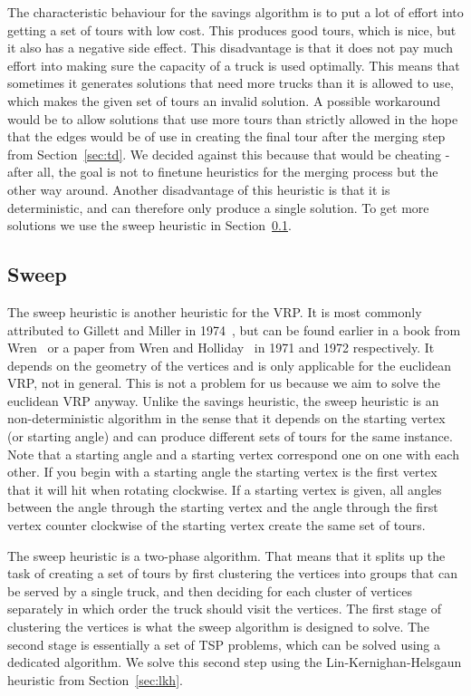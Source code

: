 \documentclass[12pt]{article}
\begin{document}
    The characteristic behaviour for the savings algorithm is to put a lot of effort into getting a
    set of tours with low cost. This produces good tours, which is nice, but it also has a negative
    side effect. This disadvantage is that it does not pay much effort into making sure the capacity
    of a truck is used optimally. This means that sometimes it generates solutions that need more
    trucks than it is allowed to use, which makes the given set of tours an invalid solution. A
    possible workaround would be to allow solutions that use more tours than strictly allowed in the
    hope that the edges would be of use in creating the final tour after the merging step from
    Section~\ref{sec:td}. We decided against this because that would be cheating - after all, the
    goal is not to finetune heuristics for the merging process but the other way around.
    Another disadvantage of this heuristic is that it is deterministic, and can therefore
    only produce a single solution. To get more solutions we use the sweep heuristic in
    Section~\ref{sec:sweep}.


    \subsection{Sweep}
    \label{sec:sweep}
    The sweep heuristic is another heuristic for the VRP\@.  It is most commonly attributed to
    Gillett and Miller in 1974~\cite{sweep}, but can be found earlier in a book from
    Wren~\cite{sweep-orig-1} or a paper from Wren and Holliday~\cite{sweep-orig-2} in 1971 and 1972
    respectively.
    It depends on the geometry of the vertices and is only applicable for the euclidean VRP, not in
    general. This is not a problem for us because we aim to solve the euclidean VRP anyway. Unlike
    the savings heuristic, the sweep heuristic is an non-deterministic algorithm in the sense that
    it depends on the starting vertex (or starting angle) and can produce different sets of tours
    for the same instance.
    Note that a starting angle and a starting vertex correspond one on one with each other. If you
    begin with a starting angle the starting vertex is the first vertex that it will hit when
    rotating clockwise. If a starting vertex is given, all angles between the angle through the
    starting vertex and the angle through the first vertex counter clockwise of the starting vertex
    create the same set of tours.

    The sweep heuristic is a two-phase algorithm. That means that it splits up the task of creating
    a set of tours by first clustering the vertices into groups that can be served by a single
    truck, and then deciding for each cluster of vertices separately in which order the truck should
    visit the vertices. The first stage of clustering the vertices is what the sweep algorithm is
    designed to solve. The second stage is essentially a set of TSP problems, which can be solved
    using a dedicated algorithm. We solve this second step using the Lin-Kernighan-Helsgaun
    heuristic from Section~\ref{sec:lkh}.
\end{document}
